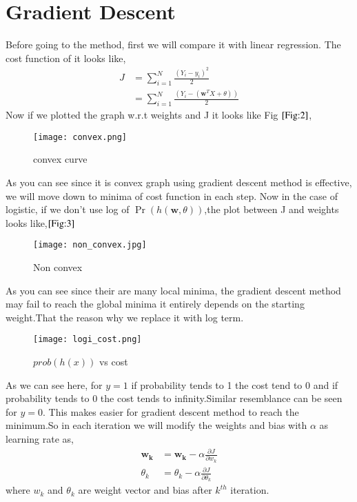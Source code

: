 \documentclass[journal,12pt,onecolumn]{IEEEtran}
\providecommand{\pr}[1]{\ensuremath{\Pr\left(#1\right)}}
\providecommand{\brak}[1]{\ensuremath{\left(#1\right)}}
\theoremstyle{remark}
\numberwithin{equation}{section}
\let\vec\mathbf
\begin{document}
		\section{Gradient Descent}
		Before going to the method, first we will compare it with linear regression. The cost function of it looks like,
		\begin{align}
			J &= \sum_{i=1}^{N}\frac{\brak{Y_i -y_i}^{2}}{2}\\
			&= \sum_{i=1}^{N}\frac{\brak{Y_i-\brak{\vec{w}^TX+\theta}}}{2}
		\end{align}
		Now if we plotted the graph w.r.t weights and J it looks like Fig $\ref{Fig:2}$,\\
		\begin{figure}
			\centering
			\texttt{[image: convex.png]}
			\caption{convex curve}
			\label{Fig:2}
		\end{figure}
		As you can see since it is convex graph using gradient descent method is effective, we will move down to minima of cost function in each step. Now in the case of logistic, if we don't use log of $\pr{h\brak{\vec{w},\theta}}$,the plot between J and weights looks like,$\ref{Fig:3}$\\
		\begin{figure}
			\centering
			\texttt{[image: non\_convex.jpg]}
			\caption{Non convex}
			\label{Fig:3}
		\end{figure}
		As you can see since their are many local minima, the gradient descent method may fail to reach the global minima it entirely depends on the starting weight.That the reason why we replace it with log term. 
		\begin{figure}
			\centering
			\texttt{[image: logi\_cost.png]}
			\caption{$prob(h(x))$ vs cost}
			\label{Fig:4}
		\end{figure}
		As we can see here, for $y=1$ if probability tends to 1 the cost tend to 0 and if probability tends to 0 the cost tends to infinity.Similar resemblance can be seen for $y=0$.
		This makes easier for gradient descent method to reach the minimum.So in each iteration we will modify the weights and bias with $\alpha$ as learning rate as,
		\begin{align}
			\vec{w_k} &= \vec{w_k} -\alpha \frac{\partial J}{\partial w_k}\label{eq:9}\\
			\theta_k &= \theta_k - \alpha \frac{\partial J}{\partial \theta_k}\label{eq:10}
		\end{align}
		where $w_k$ and $\theta_k$ are weight vector and bias after $k^{th}$ iteration.
\end{document}
